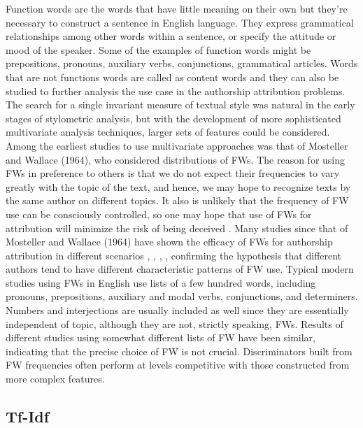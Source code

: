 Function words are the words that have little meaning on their own but they’re necessary to construct a sentence in English language. They express grammatical relationships among other words within a sentence, or specify the attitude or mood of the speaker. Some of the examples of function words might be prepositions, pronouns, auxiliary verbs, conjunctions, grammatical articles. Words that are not functions words are called as content words and they can also be studied to further analysis the use case in the authorship attribution problems. The search for a single invariant measure of textual style
was natural in the early stages of stylometric analysis, but with the development of more sophisticated multivariate analysis techniques, larger sets of features could be considered.
Among the earliest studies to use multivariate approaches was that of Mosteller and Wallace (1964), who considered distributions of FWs. The reason for using FWs in preference to others is that we do not expect their frequencies to
vary greatly with the topic of the text, and hence, we may hope to recognize texts by the same author on different topics. It also is unlikely that the frequency of FW use can be
consciously controlled, so one may hope that use of FWs for attribution will minimize the risk of being deceived \cite{chung2007psychological}.
Many studies since that of Mosteller and Wallace (1964) have shown the efficacy of FWs for authorship attribution in different scenarios \cite{argamon2005measuring}, \cite{baayen2002experiment}, 
\cite{koppel2005determining},
\cite{zhao2005effective}, confirming the hypothesis that different authors tend to have different characteristic patterns of FW use.
Typical modern studies using FWs in English use lists of a few hundred words, including pronouns, prepositions, auxiliary and modal verbs, conjunctions, and determiners.
Numbers and interjections are usually included as well since they are essentially independent of topic, although they are not, strictly speaking, FWs. Results of different studies using
somewhat different lists of FW have been similar, indicating that the precise choice of FW is not crucial. Discriminators built from FW frequencies often perform at levels competitive with those constructed from more complex features.

\subsection{Tf-Idf}


